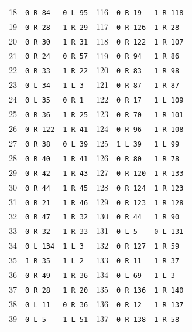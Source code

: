 \begin{longtable}{rll@{\qquad}rll}
18 & \texttt{0 R 84} & \texttt{0 L 95} & 116 & \texttt{0 R 19} & \texttt{1 R 118}\\
19 & \texttt{0 R 28} & \texttt{1 R 29} & 117 & \texttt{0 R 126} & \texttt{1 R 28}\\
20 & \texttt{0 R 30} & \texttt{1 R 31} & 118 & \texttt{0 R 122} & \texttt{1 R 107}\\
21 & \texttt{0 R 24} & \texttt{0 R 57} & 119 & \texttt{0 R 94} & \texttt{1 R 86}\\
22 & \texttt{0 R 33} & \texttt{1 R 22} & 120 & \texttt{0 R 83} & \texttt{1 R 98}\\
23 & \texttt{0 L 34} & \texttt{1 L 3} & 121 & \texttt{0 R 87} & \texttt{1 R 87}\\
24 & \texttt{0 L 35} & \texttt{0 R 1} & 122 & \texttt{0 R 17} & \texttt{1 L 109}\\
25 & \texttt{0 R 36} & \texttt{1 R 25} & 123 & \texttt{0 R 70} & \texttt{1 R 101}\\
26 & \texttt{0 R 122} & \texttt{1 R 41} & 124 & \texttt{0 R 96} & \texttt{1 R 108}\\
27 & \texttt{0 R 38} & \texttt{0 L 39} & 125 & \texttt{1 L 39} & \texttt{1 L 99}\\
28 & \texttt{0 R 40} & \texttt{1 R 41} & 126 & \texttt{0 R 80} & \texttt{1 R 78}\\
29 & \texttt{0 R 42} & \texttt{1 R 43} & 127 & \texttt{0 R 120} & \texttt{1 R 133}\\
30 & \texttt{0 R 44} & \texttt{1 R 45} & 128 & \texttt{0 R 124} & \texttt{1 R 123}\\
31 & \texttt{0 R 21} & \texttt{1 R 46} & 129 & \texttt{0 R 123} & \texttt{1 R 128}\\
32 & \texttt{0 R 47} & \texttt{1 R 32} & 130 & \texttt{0 R 44} & \texttt{1 R 90}\\
33 & \texttt{0 R 32} & \texttt{1 R 33} & 131 & \texttt{0 L 5} & \texttt{0 L 131}\\
34 & \texttt{0 L 134} & \texttt{1 L 3} & 132 & \texttt{0 R 127} & \texttt{1 R 59}\\
35 & \texttt{1 R 35} & \texttt{1 L 2} & 133 & \texttt{0 R 11} & \texttt{1 R 37}\\
36 & \texttt{0 R 49} & \texttt{1 R 36} & 134 & \texttt{0 L 69} & \texttt{1 L 3}\\
37 & \texttt{0 R 28} & \texttt{1 R 20} & 135 & \texttt{0 R 136} & \texttt{1 R 140}\\
38 & \texttt{0 L 11} & \texttt{0 R 36} & 136 & \texttt{0 R 12} & \texttt{1 R 137}\\
39 & \texttt{0 L 5} & \texttt{1 L 51} & 137 & \texttt{0 R 138} & \texttt{1 R 58}\\

\end{longtable}
